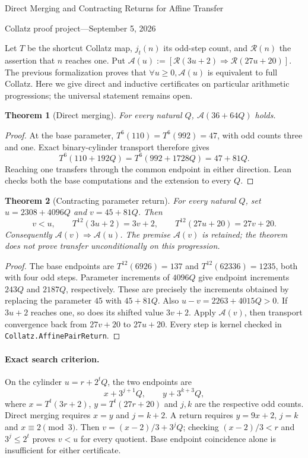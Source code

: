 \documentclass[10pt]{article}
\newtheorem{theorem}{Theorem}
\newcommand{\R}{\mathcal R}
\newcommand{\A}{\mathcal A}
\begin{document}
\begin{center}
{\Large Direct Merging and Contracting Returns for Affine Transfer}\par\medskip
Collatz proof project\quad---\quad September 5, 2026
\end{center}
Let $T$ be the shortcut Collatz map, $j_t(n)$ its odd-step count, and
$\R(n)$ the assertion that $n$ reaches one. Put
$\A(u):=[\R(3u+2)\Rightarrow\R(27u+20)]$.
The previous formalization proves that $\forall u\geq0,\A(u)$ is
equivalent to full Collatz. Here we give direct and inductive certificates
on particular arithmetic progressions; the universal statement remains open.

\begin{theorem}[Direct merging]
For every natural $Q$, $\A(36+64Q)$ holds.
\end{theorem}
\begin{proof}
At the base parameter, $T^6(110)=T^6(992)=47$, with odd counts three
and one. Exact binary-cylinder transport therefore gives
\[
T^6(110+192Q)=T^6(992+1728Q)=47+81Q.
\]
Reaching one transfers through the common endpoint in either direction.
Lean checks both the base computations and the extension to every $Q$.
\end{proof}

\begin{theorem}[Contracting parameter return]
For every natural $Q$, set $u=2308+4096Q$ and $v=45+81Q$. Then
\[
v<u,\qquad T^{12}(3u+2)=3v+2,\qquad
T^{12}(27u+20)=27v+20.
\]
Consequently $\A(v)\Rightarrow\A(u)$. The premise $\A(v)$ is retained;
the theorem does not prove transfer unconditionally on this progression.
\end{theorem}
\begin{proof}
The base endpoints are $T^{12}(6926)=137$ and $T^{12}(62336)=1235$,
both with four odd steps. Parameter increments of $4096Q$ give endpoint
increments $243Q$ and $2187Q$, respectively. These are precisely the
increments obtained by replacing the parameter $45$ with $45+81Q$.
Also $u-v=2263+4015Q>0$.
If $3u+2$ reaches one, so does its shifted value $3v+2$. Apply $\A(v)$,
then transport convergence back from $27v+20$ to $27u+20$.
Every step is kernel checked in \texttt{Collatz.AffinePairReturn}.
\end{proof}

\paragraph{Exact search criterion.}
On the cylinder $u=r+2^tQ$, the two endpoints are
\[
x+3^{j+1}Q,\qquad y+3^{k+3}Q,
\]
where $x=T^t(3r+2)$, $y=T^t(27r+20)$ and $j,k$ are the respective
odd counts. Direct merging requires $x=y$ and $j=k+2$.
A return requires $y=9x+2$, $j=k$ and $x\equiv2\pmod3$.
Then $v=(x-2)/3+3^jQ$; checking $(x-2)/3<r$ and $3^j\leq2^t$
proves $v<u$ for every quotient. Base endpoint coincidence alone is
insufficient for either certificate.
\end{document}
